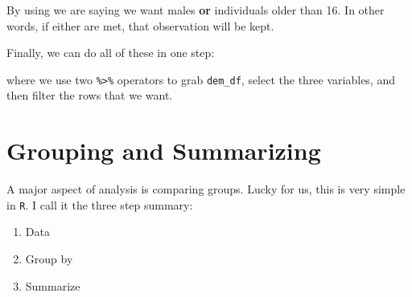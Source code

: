 \documentclass[]{tufte-book}
\newenvironment{Shaded}{}{}
\newcommand{\KeywordTok}[1]{\textcolor[rgb]{0.00,0.44,0.13}{\textbf{#1}}}
\newcommand{\DataTypeTok}[1]{\textcolor[rgb]{0.56,0.13,0.00}{#1}}
\newcommand{\DecValTok}[1]{\textcolor[rgb]{0.25,0.63,0.44}{#1}}
\newcommand{\StringTok}[1]{\textcolor[rgb]{0.25,0.44,0.63}{#1}}
\newcommand{\OperatorTok}[1]{\textcolor[rgb]{0.40,0.40,0.40}{#1}}
\newcommand{\NormalTok}[1]{#1}
\providecommand{\tightlist}{%
  \setlength{\itemsep}{0pt}\setlength{\parskip}{0pt}}
\theoremstyle{definition}
\theoremstyle{definition}
\theoremstyle{remark}
\begin{document}
By using \texttt{\textbar{}} we are saying we want males \textbf{or}
individuals older than 16. In other words, if either are met, that
observation will be kept.

Finally, we can do all of these in one step:

\begin{Shaded}
\end{Shaded}

where we use two \texttt{\%\textgreater{}\%} operators to grab
\texttt{dem\_df}, select the three variables, and then filter the rows
that we want.

\section*{Grouping and Summarizing}\label{grouping-and-summarizing}

A major aspect of analysis is comparing groups. Lucky for us, this is
very simple in \texttt{R}. I call it the three step summary:

\begin{enumerate}
\def\labelenumi{\arabic{enumi}.}
\tightlist
\item
  Data
\item
  Group by
\item
  Summarize
\end{enumerate}

\begin{Shaded}
\end{Shaded}
\end{document}
